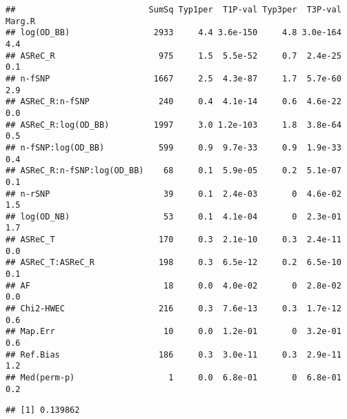 \documentclass[]{article}
\newenvironment{Shaded}{\begin{snugshade}}{\end{snugshade}}
\newcommand{\KeywordTok}[1]{\textcolor[rgb]{0.13,0.29,0.53}{\textbf{#1}}}
\newcommand{\DataTypeTok}[1]{\textcolor[rgb]{0.13,0.29,0.53}{#1}}
\newcommand{\StringTok}[1]{\textcolor[rgb]{0.31,0.60,0.02}{#1}}
\newcommand{\OperatorTok}[1]{\textcolor[rgb]{0.81,0.36,0.00}{\textbf{#1}}}
\newcommand{\NormalTok}[1]{#1}
\begin{document}
\begin{Shaded}
\end{Shaded}

\begin{verbatim}
##                           SumSq Typ1per  T1P-val Typ3per  T3P-val Marg.R
## log(OD_BB)                 2933     4.4 3.6e-150     4.8 3.0e-164    4.4
## ASReC_R                     975     1.5  5.5e-52     0.7  2.4e-25    0.1
## n-fSNP                     1667     2.5  4.3e-87     1.7  5.7e-60    2.9
## ASReC_R:n-fSNP              240     0.4  4.1e-14     0.6  4.6e-22    0.0
## ASReC_R:log(OD_BB)         1997     3.0 1.2e-103     1.8  3.8e-64    0.5
## n-fSNP:log(OD_BB)           599     0.9  9.7e-33     0.9  1.9e-33    0.4
## ASReC_R:n-fSNP:log(OD_BB)    68     0.1  5.9e-05     0.2  5.1e-07    0.1
## n-rSNP                       39     0.1  2.4e-03       0  4.6e-02    1.5
## log(OD_NB)                   53     0.1  4.1e-04       0  2.3e-01    1.7
## ASReC_T                     170     0.3  2.1e-10     0.3  2.4e-11    0.0
## ASReC_T:ASReC_R             198     0.3  6.5e-12     0.2  6.5e-10    0.1
## AF                           18     0.0  4.0e-02       0  2.8e-02    0.0
## Chi2-HWEC                   216     0.3  7.6e-13     0.3  1.7e-12    0.6
## Map.Err                      10     0.0  1.2e-01       0  3.2e-01    0.6
## Ref.Bias                    186     0.3  3.0e-11     0.3  2.9e-11    1.2
## Med(perm-p)                   1     0.0  6.8e-01       0  6.8e-01    0.2
\end{verbatim}

\begin{Shaded}
\end{Shaded}

\begin{verbatim}
## [1] 0.139862
\end{verbatim}

\begin{Shaded}
\end{Shaded}
\end{document}
